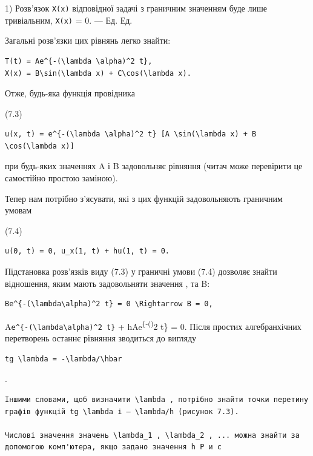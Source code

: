 \documentclass[
  ukrainian,
]{article}
\begin{document}
1) Розв'язок \texttt{X(x)} відповідної задачі з граничним значенням буде
лише тривіальним, \texttt{X(x)} = 0. --- Ед. Ед.

Загальні розв'язки цих рівнянь легко знайти:

\begin{verbatim}
T(t) = Ae^{-(\lambda \alpha)^2 t},
X(x) = B\sin(\lambda x) + C\cos(\lambda x).
\end{verbatim}

Отже, будь-яка функція провідника

(7.3)

\begin{verbatim}
u(x, t) = e^{-(\lambda \alpha)^2 t} [A \sin(\lambda x) + B \cos(\lambda x)]
\end{verbatim}

при будь-яких значеннях \lambda A і B задовольняє рівняння (читач може
перевірити це самостійно простою заміною).

Тепер нам потрібно з'ясувати, які з цих функцій задовольняють граничним
умовам

(7.4)

\begin{verbatim}
u(0, t) = 0, u_x(1, t) + hu(1, t) = 0.
\end{verbatim}

Підстановка розв'язків виду (7.3) у граничні умови (7.4) дозволяє знайти
відношення, яким мають задовольняти значення \lambda , \Lambda та B:

\begin{verbatim}
Be^{-(\lambda\alpha)^2 t} = 0 \Rightarrow B = 0,
\end{verbatim}

A\lambda \texttt{e\^{}\{-(\textbackslash{}lambda\textbackslash{}alpha)\^{}2\ t\}}
\cos \lambda + hAe\textsuperscript{\{-(\lambda\alpha)}2 t\}
\sin \lambda = 0. Після простих алгебранхічних перетворень останнє
рівняння зводиться до вигляду

\begin{verbatim}
tg \lambda = -\lambda/\hbar
\end{verbatim}

.

\begin{verbatim}
Іншими словами, щоб визначити \lambda , потрібно знайти точки перетину графів функцій tg \lambda і — \lambda/h (рисунок 7.3).

Числові значення значень \lambda_1 , \lambda_2 , ... можна знайти за допомогою комп'ютера, якщо задано значення h Р и с
\end{verbatim}
\end{document}
